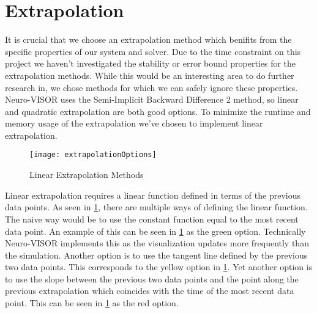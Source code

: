 
\section{Extrapolation}%
\label{sec:extrapolation}

It is crucial that we choose an extrapolation method which benifits from the specific properties of our system and solver.
Due to the time constraint on this project we haven't investigated the stability or error bound properties for the extrapolation methods.
While this would be an interesting area to do further research in, we chose methods for which we can safely ignore these properties.
Neuro-VISOR uses the Semi-Implicit Backward Difference 2 method\cite{neuroVISOR}, so linear and quadratic extrapolation are both good options.
To minimize the runtime and memory usage of the extrapolation we've chosen to implement linear extrapolation.

\begin{figure}[H]
    \centering
    \texttt{[image: extrapolationOptions]}
    \caption{Linear Extrapolation Methods}%
    \label{fig:extrapMethods}
\end{figure}

Linear extrapolation requires a linear function defined in terms of the previous data points.
As seen in \cref{fig:extrapMethods}, there are multiple ways of defining the linear function.
The naive way would be to use the constant function equal to the most recent data point.
An example of this can be seen in \cref{fig:extrapMethods} as the green option.
Technically Neuro-VISOR implements this as the visualization updates more frequently than the simulation.
Another option is to use the tangent line defined by the previous two data points.
This corresponds to the yellow option in \cref{fig:extrapMethods}.
Yet another option is to use the slope between the previous two data points and the point along the previous extrapolation which coincides with the time of the most recent data point.
This can be seen in \cref{fig:extrapMethods} as the red option.

